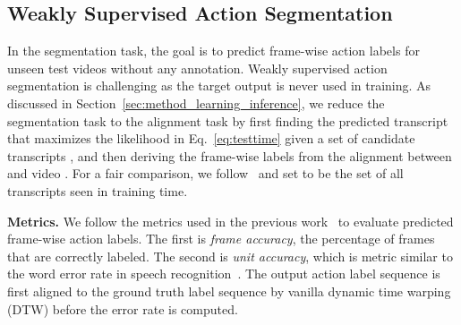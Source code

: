 \documentclass[10pt,twocolumn,letterpaper]{article}
\newcommand{\eqnref}[1]{{Eq.\ \eqref{eq:#1}}}
\begin{document}
\subsection{Weakly Supervised Action Segmentation}

In the segmentation task, the goal is to predict frame-wise action labels for unseen test videos without any annotation. Weakly supervised action segmentation is challenging as the target output is never used in training.
As discussed in Section~\ref{sec:method_learning_inference}, we reduce the segmentation task to the alignment task by first finding the predicted transcript  that maximizes the likelihood in \eqnref{testtime} given a set of candidate transcripts , and then deriving the frame-wise labels from the alignment between  and video . For a fair comparison, we follow~\cite{richard2018neuralnetwork} and set  to be the set of all transcripts seen in training time. 



{\noindent \bf  Metrics.} 
We follow the metrics used in the previous work~\cite{kuehne2014language} to evaluate predicted frame-wise action labels. The first is \emph{frame accuracy}, the percentage of frames that are correctly labeled. The second is \emph{unit accuracy}, which is metric similar to the word error rate in speech recognition~\cite{klakow2002testing}. The output action label sequence is first aligned to the ground truth label sequence by vanilla dynamic time warping (DTW) before the error rate is computed. 
\end{document}
